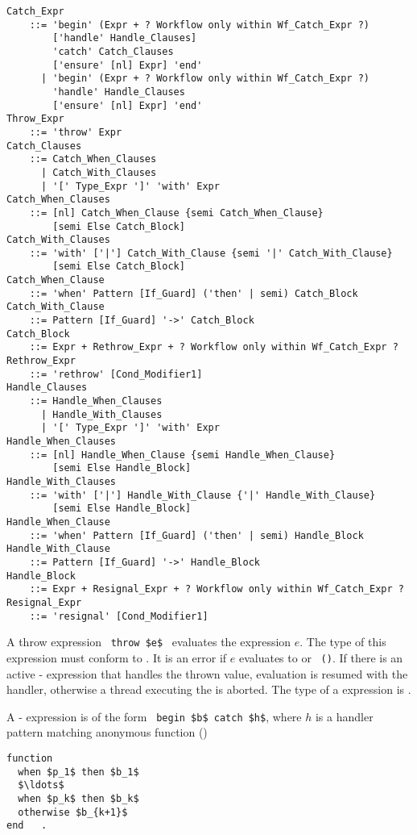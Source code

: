 \grammar\begin{lstlisting}
Catch_Expr
    ::= 'begin' (Expr + ? Workflow only within Wf_Catch_Expr ?)
        ['handle' Handle_Clauses]
        'catch' Catch_Clauses
        ['ensure' [nl] Expr] 'end'
      | 'begin' (Expr + ? Workflow only within Wf_Catch_Expr ?)
        'handle' Handle_Clauses
        ['ensure' [nl] Expr] 'end'
Throw_Expr
    ::= 'throw' Expr
Catch_Clauses 
    ::= Catch_When_Clauses
      | Catch_With_Clauses
      | '[' Type_Expr ']' 'with' Expr
Catch_When_Clauses
    ::= [nl] Catch_When_Clause {semi Catch_When_Clause}
        [semi Else Catch_Block]
Catch_With_Clauses
    ::= 'with' ['|'] Catch_With_Clause {semi '|' Catch_With_Clause}
        [semi Else Catch_Block]
Catch_When_Clause 
    ::= 'when' Pattern [If_Guard] ('then' | semi) Catch_Block
Catch_With_Clause
    ::= Pattern [If_Guard] '->' Catch_Block
Catch_Block 
    ::= Expr + Rethrow_Expr + ? Workflow only within Wf_Catch_Expr ?
Rethrow_Expr
    ::= 'rethrow' [Cond_Modifier1]
Handle_Clauses 
    ::= Handle_When_Clauses
      | Handle_With_Clauses
      | '[' Type_Expr ']' 'with' Expr
Handle_When_Clauses
    ::= [nl] Handle_When_Clause {semi Handle_When_Clause}
        [semi Else Handle_Block]
Handle_With_Clauses
    ::= 'with' ['|'] Handle_With_Clause {'|' Handle_With_Clause}
        [semi Else Handle_Block]
Handle_When_Clause 
    ::= 'when' Pattern [If_Guard] ('then' | semi) Handle_Block
Handle_With_Clause
    ::= Pattern [If_Guard] '->' Handle_Block
Handle_Block
    ::= Expr + Resignal_Expr + ? Workflow only within Wf_Catch_Expr ?
Resignal_Expr 
    ::= 'resignal' [Cond_Modifier1]
\end{lstlisting}

A throw expression ~\lstinline!throw $e$!~ evaluates the expression $e$. The type of this expression must conform to . It is an error if $e$ evaluates to  or ~\lstinline!()!. If there is an active - expression that handles the thrown value, evaluation is resumed with the handler, otherwise a thread executing the  is aborted. The type of a  expression is . 

A - expression is of the form ~\lstinline!begin $b$ catch $h$!, where $h$ is a handler pattern matching anonymous function ()

\begin{minipage}{\linewidth}
\begin{lstlisting}
function 
  when $p_1$ then $b_1$ 
  $\ldots$ 
  when $p_k$ then $b_k$ 
  otherwise $b_{k+1}$
end   .
\end{lstlisting}
\end{minipage}

